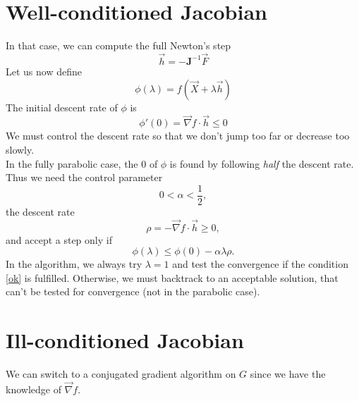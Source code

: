 \documentclass[aps,twocolumn]{revtex4}
\newcommand{\mymat}[1]{\boldsymbol{#1}}
\newcommand{\mygrad}{\vec{\nabla}}
\begin{document}

\section{Well-conditioned Jacobian}
In that case, we can compute the full Newton's step
\begin{equation}
	\vec{h} = - \mymat{J}^{-1} \vec{F}
\end{equation}
Let us now define
\begin{equation}
	\phi(\lambda) =  f \left(\vec{X} + \lambda \vec{h}\right)
\end{equation}
The initial descent rate of $\phi$ is
\begin{equation}
	\phi'(0) = \mygrad f \cdot \vec{h} \leq 0
\end{equation}
We must control the descent rate so that we don't jump too far or decrease too slowly.\\
In the fully parabolic case, the 0 of $\phi$ is found by following \emph{half} the descent rate.
Thus we need the control parameter
\begin{equation}
	0 < \alpha < \frac{1}{2},
\end{equation}
the descent rate
\begin{equation}
	\rho = - \mygrad f \cdot \vec{h} \geq 0,
\end{equation}
and accept a step only if
\begin{equation}
	\label{ok}
	\phi(\lambda) \leq \phi(0) - \alpha \lambda \rho.
\end{equation}
In the algorithm, we always try $\lambda=1$ and test the convergence
if the condition \eqref{ok} is fulfilled.
Otherwise, we must backtrack to an acceptable solution, that can't be tested for convergence (not in
the parabolic case).

\section{Ill-conditioned Jacobian}
We can switch to a conjugated gradient algorithm on $G$ since we have the knowledge of $\mygrad f$.
\end{document}
